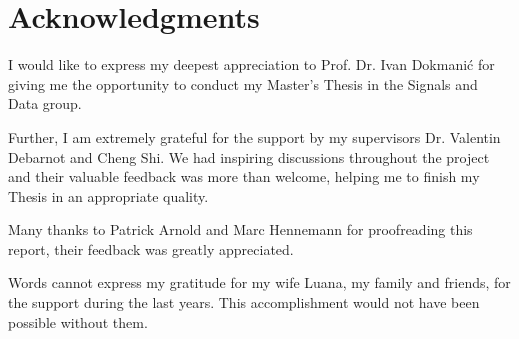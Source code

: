 \chapter{Acknowledgments}

I would like to express my deepest appreciation to Prof. Dr. Ivan Dokmanić
for giving me the opportunity to conduct my Master's Thesis in the 
Signals and Data group.

\bigskip

Further, I am extremely grateful for the support by my supervisors
Dr. Valentin Debarnot and Cheng Shi. We had inspiring discussions
throughout the project and their valuable feedback was more than welcome,
helping me to finish my Thesis in an appropriate quality.

\bigskip
Many thanks to Patrick Arnold and Marc Hennemann for 
proofreading this report, their feedback was greatly appreciated.

\bigskip
Words cannot express my gratitude for my wife Luana, my family and friends,
for the support during the last years.
This accomplishment would not have been possible without them.